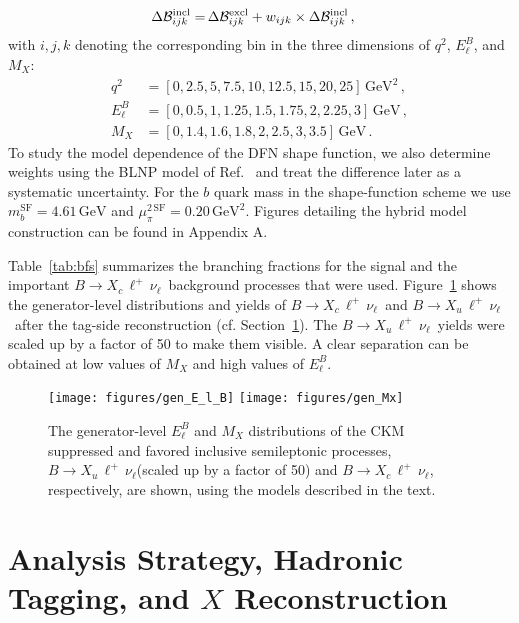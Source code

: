 \documentclass[twocolumn,aps,prd,superscriptaddress,nofootinbib,floatfix,preprintnumbers,a4]{revtex4-1}
\newcommand{\nn}{\nonumber}
\newcommand{\bulnu}{\ensuremath{B \to X_u \, \ell^+\, \nu_{\ell}}\xspace}
\newcommand{\bclnu}{\ensuremath{B \to X_c \, \ell^+\, \nu_{\ell}}\xspace}
\begin{document}
\begin{equation}
\begin{aligned}
 \Delta \mathcal{B}_{ijk}^{\rm incl} = & \,   \Delta \mathcal{B}_{ijk}^{\rm excl} + w_{ijk} \times  \Delta \mathcal{B}_{ijk}^{\rm incl} \, ,
\end{aligned}
\end{equation}
with $i,j,k$ denoting the corresponding bin in the three dimensions of $q^2$, $E_\ell^B$, and $M_X$:
\begin{equation}
\begin{aligned}
 q^2 & = [0,2.5,5,7.5,10,12.5,15,20,25] \, \text{GeV}^2 \, , \nn \\
 E_\ell^B & = [0,0.5,1,1.25,1.5,1.75,2,2.25,3] \, \text{GeV} \, , \nn \\
 M_X & = [0,1.4,1.6,1.8,2,2.5,3,3.5]  \, \text{GeV}  \, .
\end{aligned}
\end{equation}
To study the model dependence of the DFN shape function, we also determine weights using the BLNP model of Ref.~\cite{Lange:2005yw} and treat the difference later as a systematic uncertainty. For the $b$ quark mass in the shape-function scheme we use $m_{b}^{\mathrm{SF}} = 4.61\,\mathrm{GeV}$ and $\mu_{\pi}^{2\, \text{SF}} = 0.20 \,\mathrm{GeV}^2$. Figures detailing the hybrid model construction can be found in Appendix A. 

Table~\ref{tab:bfs} summarizes the branching fractions for the signal and the important \bclnu\ background processes that were used. Figure~\ref{fig:bulnu_bclnu_mX_El} shows the generator-level distributions and yields of \bclnu\ and \bulnu\ after the tag-side reconstruction (cf. Section~\ref{sec:ana_strategy}). The \bulnu\ yields were scaled up by a factor of 50 to make them visible. A clear separation can be obtained at low values of $M_X$ and high values of $E_\ell^B$.


\begin{figure}[ht!]
  \texttt{[image: figures/gen\_E\_l\_B]} 
  \texttt{[image: figures/gen\_Mx]} 
\caption{
The generator-level $E_\ell^B$ and $M_X$ distributions of the CKM suppressed and favored inclusive semileptonic processes, \bulnu (scaled up by a factor of 50) and \bclnu, respectively, are shown, using the models described in the text.
 }
\label{fig:bulnu_bclnu_mX_El}
\end{figure}


\section{Analysis Strategy, Hadronic Tagging, and $X$ Reconstruction}\label{sec:ana_strategy}
\end{document}
